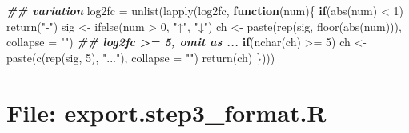 \documentclass[
]{article}
\newenvironment{Shaded}{\begin{snugshade}}{\end{snugshade}}
\newcommand{\AttributeTok}[1]{\textcolor[rgb]{0.77,0.63,0.00}{#1}}
\newcommand{\ControlFlowTok}[1]{\textcolor[rgb]{0.13,0.29,0.53}{\textbf{#1}}}
\newcommand{\DecValTok}[1]{\textcolor[rgb]{0.00,0.00,0.81}{#1}}
\newcommand{\DocumentationTok}[1]{\textcolor[rgb]{0.56,0.35,0.01}{\textbf{\textit{#1}}}}
\newcommand{\FunctionTok}[1]{\textcolor[rgb]{0.00,0.00,0.00}{#1}}
\newcommand{\NormalTok}[1]{#1}
\newcommand{\OtherTok}[1]{\textcolor[rgb]{0.56,0.35,0.01}{#1}}
\newcommand{\SpecialCharTok}[1]{\textcolor[rgb]{0.00,0.00,0.00}{#1}}
\newcommand{\StringTok}[1]{\textcolor[rgb]{0.31,0.60,0.02}{#1}}
\begin{document}
\begin{Shaded}
\begin{Highlighting}[]
                \DocumentationTok{\#\# variation}
                \AttributeTok{log2fc =} \FunctionTok{unlist}\NormalTok{(}\FunctionTok{lapply}\NormalTok{(log2fc, }\ControlFlowTok{function}\NormalTok{(num)\{}
                                         \ControlFlowTok{if}\NormalTok{(}\FunctionTok{abs}\NormalTok{(num) }\SpecialCharTok{\textless{}} \DecValTok{1}\NormalTok{)}
                                           \FunctionTok{return}\NormalTok{(}\StringTok{"{-}"}\NormalTok{)}
\NormalTok{                                         sig }\OtherTok{\textless{}{-}} \FunctionTok{ifelse}\NormalTok{(num }\SpecialCharTok{\textgreater{}} \DecValTok{0}\NormalTok{, }\StringTok{"↑"}\NormalTok{, }\StringTok{"↓"}\NormalTok{)}
\NormalTok{                                         ch }\OtherTok{\textless{}{-}} \FunctionTok{paste}\NormalTok{(}\FunctionTok{rep}\NormalTok{(sig, }\FunctionTok{floor}\NormalTok{(}\FunctionTok{abs}\NormalTok{(num))), }\AttributeTok{collapse =} \StringTok{""}\NormalTok{)}
                                         \DocumentationTok{\#\# log2fc \textgreater{}= 5, omit as ...}
                                         \ControlFlowTok{if}\NormalTok{(}\FunctionTok{nchar}\NormalTok{(ch) }\SpecialCharTok{\textgreater{}=} \DecValTok{5}\NormalTok{)}
\NormalTok{                                           ch }\OtherTok{\textless{}{-}} \FunctionTok{paste}\NormalTok{(}\FunctionTok{c}\NormalTok{(}\FunctionTok{rep}\NormalTok{(sig, }\DecValTok{5}\NormalTok{), }\StringTok{"..."}\NormalTok{), }\AttributeTok{collapse =} \StringTok{""}\NormalTok{)}
                                         \FunctionTok{return}\NormalTok{(ch)}
\NormalTok{                                       \})))}
\end{Highlighting}
\end{Shaded}

\hypertarget{file-export.step3_format.r}{%
\section{File: export.step3\_format.R}\label{file-export.step3_format.r}}
\end{document}
